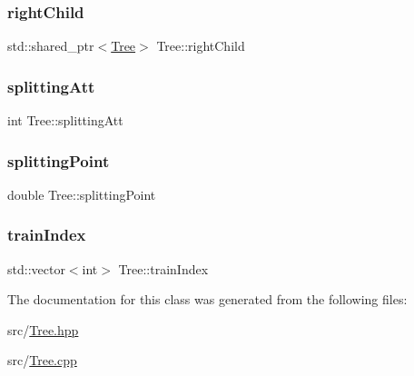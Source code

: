 \subsubsection{\texorpdfstring{right\+Child}{rightChild}}
{\footnotesize\ttfamily std\+::shared\+\_\+ptr$<$\hyperlink{classTree}{Tree}$>$ Tree\+::right\+Child\hspace{0.3cm}{\ttfamily [private]}}

\mbox{\label{classTree_aae862b9dbe28c1f9d14ad408569b3078}} 
\subsubsection{\texorpdfstring{splitting\+Att}{splittingAtt}}
{\footnotesize\ttfamily int Tree\+::splitting\+Att\hspace{0.3cm}{\ttfamily [private]}}

\mbox{\label{classTree_a0aeb8a2115f635608ca9a9b0304d304c}} 
\subsubsection{\texorpdfstring{splitting\+Point}{splittingPoint}}
{\footnotesize\ttfamily double Tree\+::splitting\+Point\hspace{0.3cm}{\ttfamily [private]}}

\mbox{\label{classTree_a571ce830364b91f9467f5d464ca119e0}} 
\subsubsection{\texorpdfstring{train\+Index}{trainIndex}}
{\footnotesize\ttfamily std\+::vector$<$int$>$ Tree\+::train\+Index}



The documentation for this class was generated from the following files\+:\begin{DoxyCompactItemize}
\item 
src/\hyperlink{Tree_8hpp}{Tree.\+hpp}\item 
src/\hyperlink{Tree_8cpp}{Tree.\+cpp}\end{DoxyCompactItemize}
